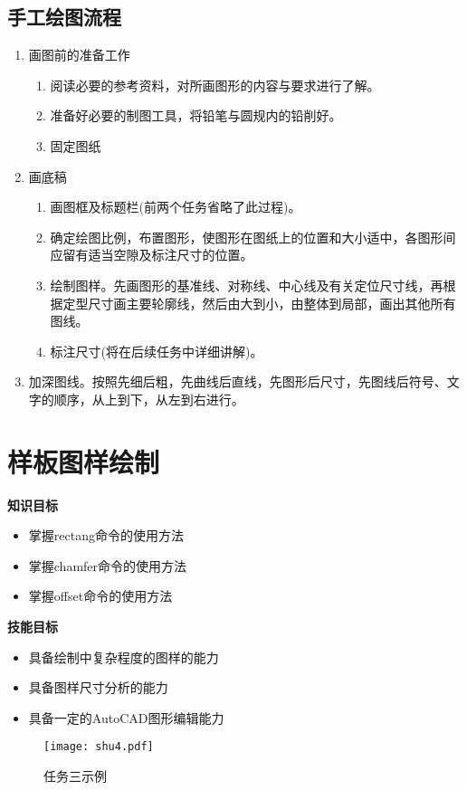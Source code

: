 \subsection{手工绘图流程}
\begin{enumerate}
\item 画图前的准备工作
    \begin{enumerate}
    \item 阅读必要的参考资料，对所画图形的内容与要求进行了解。
    \item 准备好必要的制图工具，将铅笔与圆规内的铅削好。
    \item 固定图纸
    \end{enumerate}
\item 画底稿
\begin{enumerate}
\item 画图框及标题栏(前两个任务省略了此过程)。
\item 确定绘图比例，布置图形，使图形在图纸上的位置和大小适中，各图形间应留有适当空隙及标注尺寸的位置。
\item 绘制图样。先画图形的基准线、对称线、中心线及有关定位尺寸线，再根据定型尺寸画主要轮廓线，然后由大到小，由整体到局部，画出其他所有图线。
\item 标注尺寸(将在后续任务中详细讲解)。
\end{enumerate}
\item 加深图线。按照先细后粗，先曲线后直线，先图形后尺寸，先图线后符号、文字的顺序，从上到下，从左到右进行。

\end{enumerate}
\section{样板图样绘制}
{\bfseries 知识目标}
\begin{itemize}
\item 掌握rectang命令的使用方法
\item 掌握chamfer命令的使用方法
\item 掌握offset命令的使用方法
\end{itemize}
{\bfseries 技能目标}
\begin{itemize}
\item 具备绘制中复杂程度的图样的能力
\item 具备图样尺寸分析的能力
\item 具备一定的AutoCAD图形编辑能力
\end{itemize}
\begin{figure}[htbp]
\centering
\texttt{[image: shu4.pdf]}
\caption{任务三示例}\label{fig:renwu3}
\end{figure}
